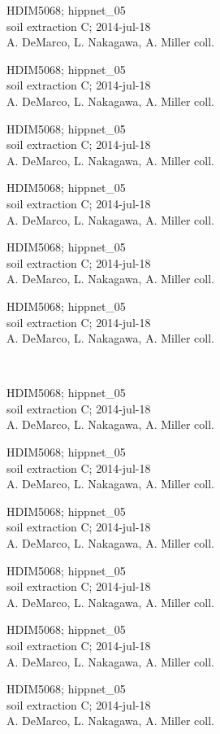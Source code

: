 \documentclass[2pt]{extarticle}
\begin{document}
\noindent
\parbox{0.16\textwidth}{\tiny \raggedright \rule[-0.3\baselineskip]{0pt}{10pt}HDIM5068; hippnet\_05\\ soil extraction C; 2014-jul-18\\ A. DeMarco, L. Nakagawa, A. Miller coll.}
\parbox{0.16\textwidth}{\tiny \raggedright \rule[-0.3\baselineskip]{0pt}{10pt}HDIM5068; hippnet\_05\\ soil extraction C; 2014-jul-18\\ A. DeMarco, L. Nakagawa, A. Miller coll.}
\parbox{0.16\textwidth}{\tiny \raggedright \rule[-0.3\baselineskip]{0pt}{10pt}HDIM5068; hippnet\_05\\ soil extraction C; 2014-jul-18\\ A. DeMarco, L. Nakagawa, A. Miller coll.}
\parbox{0.16\textwidth}{\tiny \raggedright \rule[-0.3\baselineskip]{0pt}{10pt}HDIM5068; hippnet\_05\\ soil extraction C; 2014-jul-18\\ A. DeMarco, L. Nakagawa, A. Miller coll.}
\parbox{0.16\textwidth}{\tiny \raggedright \rule[-0.3\baselineskip]{0pt}{10pt}HDIM5068; hippnet\_05\\ soil extraction C; 2014-jul-18\\ A. DeMarco, L. Nakagawa, A. Miller coll.}
\parbox{0.16\textwidth}{\tiny \raggedright \rule[-0.3\baselineskip]{0pt}{10pt}HDIM5068; hippnet\_05\\ soil extraction C; 2014-jul-18\\ A. DeMarco, L. Nakagawa, A. Miller coll.} \\ 
\vspace{0.001in} 

\noindent
\parbox{0.16\textwidth}{\tiny \raggedright \rule[-0.3\baselineskip]{0pt}{10pt}HDIM5068; hippnet\_05\\ soil extraction C; 2014-jul-18\\ A. DeMarco, L. Nakagawa, A. Miller coll.}
\parbox{0.16\textwidth}{\tiny \raggedright \rule[-0.3\baselineskip]{0pt}{10pt}HDIM5068; hippnet\_05\\ soil extraction C; 2014-jul-18\\ A. DeMarco, L. Nakagawa, A. Miller coll.}
\parbox{0.16\textwidth}{\tiny \raggedright \rule[-0.3\baselineskip]{0pt}{10pt}HDIM5068; hippnet\_05\\ soil extraction C; 2014-jul-18\\ A. DeMarco, L. Nakagawa, A. Miller coll.}
\parbox{0.16\textwidth}{\tiny \raggedright \rule[-0.3\baselineskip]{0pt}{10pt}HDIM5068; hippnet\_05\\ soil extraction C; 2014-jul-18\\ A. DeMarco, L. Nakagawa, A. Miller coll.}
\parbox{0.16\textwidth}{\tiny \raggedright \rule[-0.3\baselineskip]{0pt}{10pt}HDIM5068; hippnet\_05\\ soil extraction C; 2014-jul-18\\ A. DeMarco, L. Nakagawa, A. Miller coll.}
\parbox{0.16\textwidth}{\tiny \raggedright \rule[-0.3\baselineskip]{0pt}{10pt}HDIM5068; hippnet\_05\\ soil extraction C; 2014-jul-18\\ A. DeMarco, L. Nakagawa, A. Miller coll.} \\ 
\vspace{0.001in} 
\end{document}
